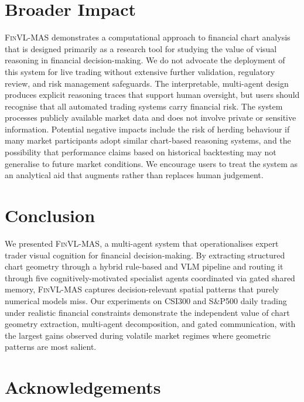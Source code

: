 \section{Broader Impact}
\label{sec:impact}

\textsc{FinVL-MAS} demonstrates a computational approach to financial chart analysis that is designed primarily as a research tool for studying the value of visual reasoning in financial decision-making. We do not advocate the deployment of this system for live trading without extensive further validation, regulatory review, and risk management safeguards. The interpretable, multi-agent design produces explicit reasoning traces that support human oversight, but users should recognise that all automated trading systems carry financial risk. The system processes publicly available market data and does not involve private or sensitive information. Potential negative impacts include the risk of herding behaviour if many market participants adopt similar chart-based reasoning systems, and the possibility that performance claims based on historical backtesting may not generalise to future market conditions. We encourage users to treat the system as an analytical aid that augments rather than replaces human judgement.

\section{Conclusion}
\label{sec:conclusion}

We presented \textsc{FinVL-MAS}, a multi-agent system that operationalises expert trader visual cognition for financial decision-making. By extracting structured chart geometry through a hybrid rule-based and VLM pipeline and routing it through five cognitively-motivated specialist agents coordinated via gated shared memory, \textsc{FinVL-MAS} captures decision-relevant spatial patterns that purely numerical models miss. Our experiments on CSI300 and S\&P500 daily trading under realistic financial constraints demonstrate the independent value of chart geometry extraction, multi-agent decomposition, and gated communication, with the largest gains observed during volatile market regimes where geometric patterns are most salient.

\section*{Acknowledgements}


